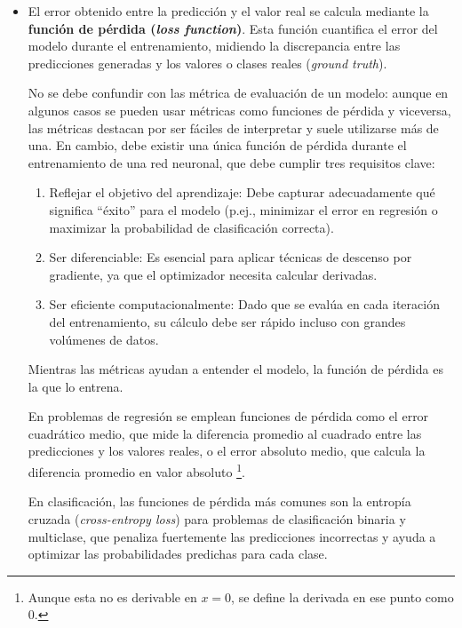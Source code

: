 \begin{itemize}

    \item El error obtenido entre la predicción y el valor real se calcula mediante la \textbf{función de 
    pérdida (\textit{loss function})}. Esta función cuantifica el error del modelo durante el entrenamiento, 
    midiendo la discrepancia entre las predicciones generadas y los valores o clases reales (\textit{ground 
    truth}).

    No se debe confundir con las métrica de evaluación de un modelo: aunque en algunos casos se pueden usar 
    métricas como funciones de pérdida y viceversa, las métricas destacan por ser fáciles de interpretar 
    y suele utilizarse más de una. En cambio, debe existir una única función de pérdida durante el 
    entrenamiento de una red neuronal, que debe cumplir tres requisitos clave:

    \begin{enumerate}

        \item Reflejar el objetivo del aprendizaje: Debe capturar adecuadamente qué significa ``éxito'' para 
        el modelo (p.ej., minimizar el error en regresión o maximizar la probabilidad de clasificación 
        correcta).

        \item Ser diferenciable: Es esencial para aplicar técnicas de descenso por gradiente, ya que el 
        optimizador necesita calcular derivadas.

        \item Ser eficiente computacionalmente: Dado que se evalúa en cada iteración del entrenamiento, su 
        cálculo debe ser rápido incluso con grandes volúmenes de datos.

    \end{enumerate}

    Mientras las métricas ayudan a entender el modelo, la función de pérdida es la que lo entrena.

    En problemas de regresión se emplean funciones de pérdida como el error cuadrático medio, que mide la 
    diferencia promedio al cuadrado entre las predicciones y los valores reales, o el error absoluto medio, 
    que calcula la diferencia promedio en valor absoluto%
    \footnote{
        Aunque esta no es derivable en $x=0$, se define la derivada en ese punto como 0.
    }.

    En clasificación, las funciones de pérdida más comunes son la entropía cruzada (\textit{cross-entropy 
    loss}) para problemas de clasificación binaria y multiclase, que penaliza fuertemente las predicciones 
    incorrectas y ayuda a optimizar las probabilidades predichas para cada clase.



\end{itemize}

